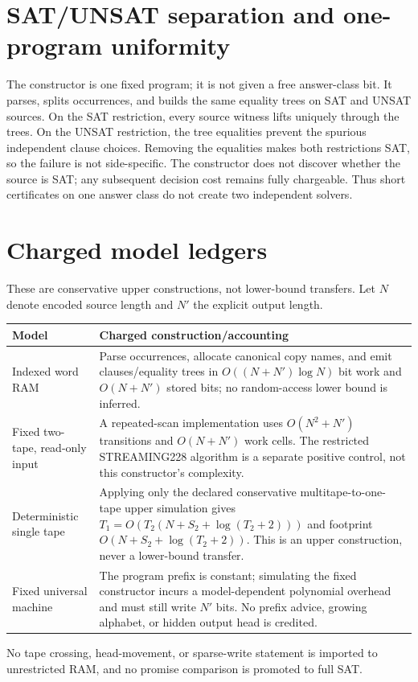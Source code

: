 \documentclass[11pt]{article}
\begin{document}
\section{SAT/UNSAT separation and one-program uniformity}
The constructor is one fixed program; it is not given a free answer-class bit.
It parses, splits occurrences, and builds the same equality trees on SAT and
UNSAT sources.  On the SAT restriction, every source witness lifts uniquely
through the trees.  On the UNSAT restriction, the tree equalities prevent the
spurious independent clause choices.  Removing the equalities makes both
restrictions SAT, so the failure is not side-specific.  The constructor does
not discover whether the source is SAT; any subsequent decision cost remains
fully chargeable.  Thus short certificates on one answer class do not create
two independent solvers.

\section{Charged model ledgers}
These are conservative upper constructions, not lower-bound transfers.
Let $N$ denote encoded source length and $N'$ the explicit output length.
\begin{center}
\begin{tabular}{p{.22\linewidth}p{.69\linewidth}}
\toprule
Model & Charged construction/accounting\\
\midrule
Indexed word RAM & Parse occurrences, allocate canonical copy names, and emit
clauses/equality trees in $O((N+N')\log N)$ bit work and $O(N+N')$ stored bits;
no random-access lower bound is inferred.\\
Fixed two-tape, read-only input & A repeated-scan implementation uses
$O(N^2+N')$ transitions and $O(N+N')$ work cells.  The restricted
STREAMING228 algorithm is a separate positive control, not this constructor's
complexity.\\
Deterministic single tape & Applying only the declared conservative
multitape-to-one-tape upper simulation gives
$T_1=O(T_2(N+S_2+\log(T_2+2)))$ and footprint
$O(N+S_2+\log(T_2+2))$.  This is an upper construction, never a lower-bound
transfer.\\
Fixed universal machine & The program prefix is constant; simulating the
fixed constructor incurs a model-dependent polynomial overhead and must still
write $N'$ bits.  No prefix advice, growing alphabet, or hidden output head is
credited.\\
\bottomrule
\end{tabular}
\end{center}
No tape crossing, head-movement, or sparse-write statement is imported to
unrestricted RAM, and no promise comparison is promoted to full SAT.
\end{document}
